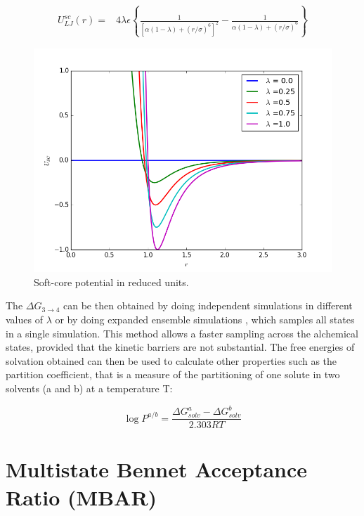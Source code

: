 \begin{equation}
\label{eq:softcoreLJ}
\begin{aligned}
U_{LJ}^{sc}(r) {}=& 4\lambda\epsilon \left\lbrace\frac{1}{\left[\alpha(1-\lambda)+ (r/\sigma)^{6}\right]^{2}} - \frac{1}{\alpha(1-\lambda)+(r/\sigma)^{6}}\right\rbrace
\end{aligned}
\end{equation}

\begin{figure}[H]
	\centering
	\includegraphics[width=0.9\linewidth]{Figures/SC}
	\caption{Soft-core potential in reduced units.}
	\label{fig:SC}
\end{figure}

The $\Delta G_{3 \rightarrow 4}$ can be then obtained by doing independent simulations in different values of $\lambda$ or by doing expanded ensemble simulations \cite{lyubartsev}, which samples all states in a single simulation. This method allows a faster sampling across the alchemical states, provided that the kinetic barriers are not substantial. The free energies of solvation obtained can then be used to calculate other properties such as the partition coefficient, that is a measure of the partitioning of one solute in two solvents (a and b) at a temperature T:

\begin{equation}
\label{eqn:partcoe}
\log{P}^{a/b} = \frac{\Delta G_{solv}^{a} - \Delta G_{solv}^{b}}{2.303RT}
\end{equation}



\section{Multistate Bennet Acceptance Ratio (MBAR)}\label{mbar}

